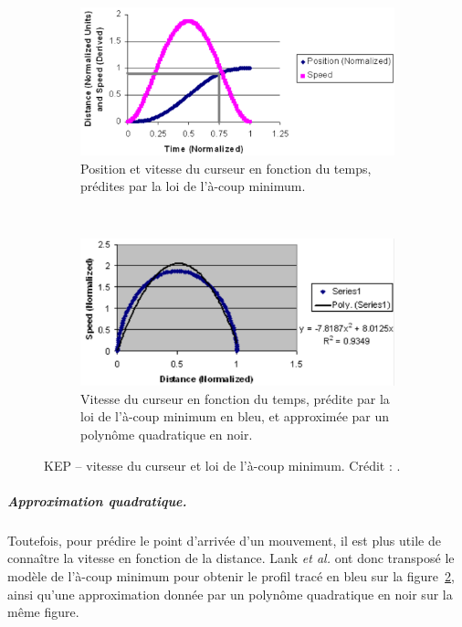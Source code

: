 	\begin{figure}[!htb]
		\begin{subfigure}[t]{0.49\textwidth}
			\centering
			\includegraphics[width=\textwidth]{figures/ch2/kepPS}
			\caption{Position et vitesse du curseur en fonction du temps, prédites par la loi de l'à-coup minimum.}
			\label{fig:kepPS}
		\end{subfigure}
		~
		\begin{subfigure}[t]{0.49\textwidth}
			\centering
			\includegraphics[width=\textwidth]{figures/ch2/kepQuad}
			\caption{Vitesse du curseur en fonction du temps, prédite par la loi de l'à-coup minimum en bleu, et approximée par un polynôme quadratique en noir.}
			\label{fig:kepQuad}
		\end{subfigure}
		\caption[KEP -- vitesse du curseur et loi de l'à-coup minimum]{KEP -- vitesse du curseur et loi de l'à-coup minimum. Crédit : \cite{lank2007endpoint}.}
		\label{fig:kep}
	\end{figure}
	
	\subparagraph{Approximation quadratique.}
	Toutefois, pour prédire le point d'arrivée d'un mouvement, il est plus utile de connaître la vitesse en fonction de la distance. Lank \emph{et al.} ont donc transposé le modèle de l'à-coup minimum pour obtenir le profil tracé en bleu sur la figure~\ref{fig:kepQuad}, ainsi qu'une approximation donnée par un polynôme quadratique en noir sur la même figure.
	
